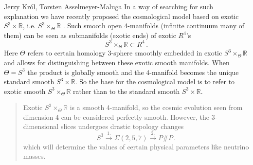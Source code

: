 \begin{artengenv2auth}{Jerzy Kr\'ol, Torsten Asselmeyer-Maluga}
In a way of searching for such explanation we have recently proposed the cosmological model based on exotic $S^3\times \mathbb{R}$, i.e. $S^3\times_{\Theta}\mathbb{R}$ \parencite{AK2018,AK2014,AK2019}. Such smooth open 4-manifolds (infinite continuum many of them) can be seen as submanifolds (exotic ends) of exotic $R^4$'s
\[ S^3\times_{\Theta} \mathbb{R}\subset R^4\,. \]
Here $\Theta$ refers to certain homology 3-sphere smoothly embedded in exotic $S^3\times_{\Theta} \mathbb{R}$
and allows for distinguishing between these exotic smooth manifolds. When $\Theta = S^3$ the product is globally smooth and the 4-manifold becomes the unique standard smooth $S^3\times \mathbb{R}$. 
So the base for the cosmological model is to refer to exotic smooth $S^3\times_{\Theta}\mathbb{R}$ rather than to the standard smooth $S^3\times \mathbb{R}$.
\begin{quotation}
Exotic $S^3\times_{\Theta}\mathbb{R}$ is a smooth 4-manifold, so the cosmic evolution seen from dimension 4 can be considered perfectly smooth. However, the 3-dimensional slices undergoes drastic topology changes
\begin{equation}\label{S3}S^3\overset{1.}{\to} \Sigma(2,5,7) \overset{2.}{\to}P\# P\,.  \end{equation}
which will determine the values of certain physical parameters like neutrino masses.


\end{quotation}
\end{artengenv2auth}
